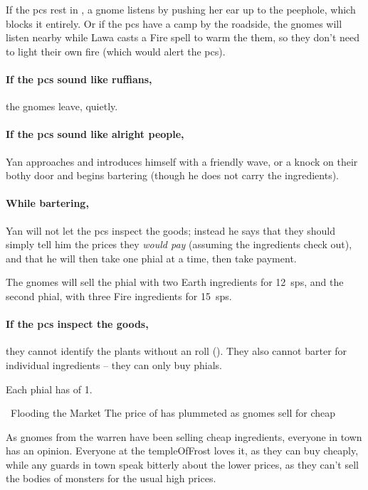 If the \glspl{pc} rest in , a gnome listens by pushing her ear up to the peephole, which blocks it entirely.
Or if the \glspl{pc} have a camp by the roadside, the gnomes will listen nearby while Lawa casts a Fire spell to warm the them, so they don't need to light their own fire (which would alert the \glspl{pc}).

\paragraph{If the \glspl{pc} sound like ruffians,}
the gnomes leave, quietly.

\paragraph{If the \glspl{pc} sound like alright people,}
Yan approaches and introduces himself with a friendly wave, or a knock on their \gls{bothy} door and begins bartering (though he does not carry the \glspl{ingredient}).

\paragraph{While bartering,}
Yan will not let the \glspl{pc} inspect the goods; instead he says that they should simply tell him the prices they \textit{would pay} (assuming the \glspl{ingredient} check out), and that he will then take one phial at a time, then take payment.

The gnomes will sell the phial with two Earth \glspl{ingredient} for 12~\glspl{sp}, and the second phial, with three Fire \glspl{ingredient} for 15~\glspl{sp}.

\paragraph{If the \glspl{pc} inspect the goods,}
they cannot identify the plants without an  roll (\tn[12]).
They also cannot barter for individual \glspl{ingredient} -- they can only buy phials.

Each phial has  of 1.

{\squash~Flooding the Market}%
{The price of  has plummeted as gnomes sell for cheap}%

\begin{exampletext}
  As gnomes from the \gls{warren} have been selling cheap \glspl{ingredient}, everyone in town has an opinion.
  Everyone at the \gls{templeOfFrost} loves it, as they can buy cheaply, while any \glspl{guard} in town speak bitterly about the lower prices, as they can't sell the bodies of \glspl{monster} for the usual high prices.
\end{exampletext}

